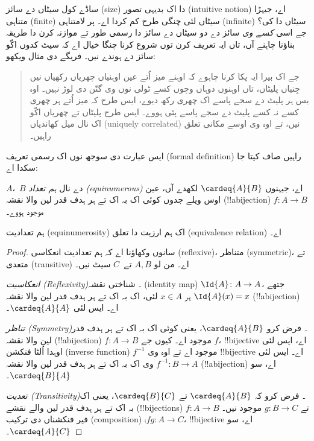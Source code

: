 \documentclass[../../../include/open-logic-section]{subfiles}
\begin{document}


ساڈے کول سیٹاں دے سائز (size) دا اک بدیہی تصور (intuitive notion) اے،
جیہڑا متناہی (finite) سیٹاں لئی چنگی طرح کم کردا اے۔ پر لامتناہی
(infinite) سیٹاں دا کی؟ جے اسی \emph{کسے وی} سائز دے دو سیٹاں دے
سائز دا رسمی طور تے موازنہ کرن دا طریقہ بناؤنا چاہنے آں، تاں ایہ
تعریف کرن توں شروع کرنا چنگا خیال اے کہ سیٹ کدوں اکّو سائز دے ہوندے
نیں۔ فریگے دی مثال ویکھو:
\begin{quote}
  جے اک بیرا ایہ پکا کرنا چاہوے کہ اوہنے میز اُتے عین اوہنیاں چھریاں
  رکھیاں نیں جِنیاں پلیٹاں، تاں اوہنوں دوہاں وچوں کسے ٹولی نوں وی گنّن
  دی لوڑ نہیں۔ اوہ بس ہر پلیٹ دے سجے پاسے اک چھری رکھ دیوے، ایس طرح
  کہ میز اُتے ہر چھری کسے نہ کسے پلیٹ دے سجے پاسے پئی ہووے۔ ایس طرح
  پلیٹاں تے چھریاں اکّو اک نال میل کھاندیاں (uniquely correlated)
  نیں، تے اوہ وی اوسے مکانی تعلق راہیں۔ \citep[\S70]{Frege1884}
\end{quote}
ایس عبارت دی سوجھ نوں اک رسمی تعریف (formal definition) راہیں صاف
کیتا جا سکدا اے:

\begin{defn}
  $A$،~$B$ دے نال \emph{ہم تعداد (equinumerous)} اے، جیہنوں
  $\cardeq{A}{B}$ لکھدے آں، عین اوس ویلے جدوں کوئی اک بہ اک تے ہر
  ہدف قدر لین والا نقشہ (!!a{bijection}) $f \colon A \to B$ موجود
  ہووے۔
\end{defn}

\begin{prop}
ہم تعدادیت (equinumerosity) اک ہم ارزیت دا تعلق (equivalence relation)
اے۔
\end{prop}

\begin{proof}
سانوں وکھاؤنا اے کہ ہم تعدادیت انعکاسی (reflexive)، متناظر
(symmetric)، تے متعدی (transitive) اے۔ من لو $A, B$ تے~$C$ سیٹ نیں۔

\emph{انعکاسیت (Reflexivity)۔} شناختی نقشہ (identity map)
$\Id{A} \colon A \to A$، جتھے $\Id{A} (x) = x$ ہر $x \in A$ لئی،
اک بہ اک تے ہر ہدف قدر لین والا نقشہ
(!!a{bijection}) اے۔ ایس لئی $\cardeq{A}{A}$۔

\emph{تناظر (Symmetry)۔} فرض کرو $\cardeq{A}{B}$، یعنی کوئی اک بہ
اک تے ہر ہدف قدر لین والا نقشہ (!!a{bijection})
$f\colon A \to B$ موجود اے۔ کیوں جے $f$، !!{bijective} اے، ایس لئی
اوہدا اُلٹا فنکشن (inverse function) $f^{-1}$ موجود اے تے اوہ وی
!!{bijective} اے۔ ایس لئی $f^{-1}\colon B \to A$ وی اک بہ اک تے ہر
ہدف قدر لین والا نقشہ (!!a{bijection}) اے، سو $\cardeq{B}{A}$۔

\emph{تعدیت (Transitivity)۔} فرض کرو کہ $\cardeq{A}{B}$ تے
$\cardeq{B}{C}$، یعنی اک بہ اک تے ہر ہدف قدر لین والے نقشے
(!!{bijection}s) $f\colon A \to B$ تے $g\colon B \to C$ موجود
نیں۔ فیر فنکشناں دی ترکیب (composition)
$\comp{f}{g}\colon A \to C$، !!{bijective} اے، سو
$\cardeq{A}{C}$۔
\end{proof}
\end{document}
